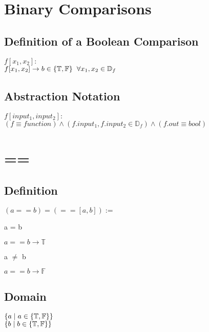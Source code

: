 \documentclass[11pt]{article}
\begin{document}
\section{Binary Comparisons}


\subsection{Definition of a Boolean Comparison}
\vspace{3mm}
\begin{center}
$
f[x_1,x_2] :
$
\\ \vspace{2mm}
$
f[x_1,x_2] \rightarrow b \in \{\mathbb{T},\mathbb{F}\} \hspace{2mm} \forall x_1,x_2 \in \mathbb{D}_f
$
\end{center}

\subsection{Abstraction Notation}
\begin{center}
$
f[input_1,input_2] :
$
\\ \vspace{2mm}
$
(f \equiv function) \land (f.input_1, f.input_2 \in \mathbb{D}_f) \land (f.out \equiv bool)
$
\end{center}


\section{==}
\subsection{Definition}
\begin{center}
$
(a == b) = (==[a,b]) :=
$
\end{center}
a = b
\begin{center}
$
a == b \rightarrow \mathbb{T}
$
\end{center}
\vspace{2mm}
a $\neq$ b
\begin{center}
$
a == b \rightarrow \mathbb{F}
$
\end{center}
\subsection{Domain}
\begin{center}
$
\{a \hspace{1mm} | \hspace{1mm} a \in \{\mathbb{T},\mathbb{F}\} \}
$
\\ \vspace{2mm}
$
\{b \hspace{1mm} | \hspace{1mm} b \in \{\mathbb{T},\mathbb{F}\} \}
$
\end{center}
\end{document}
